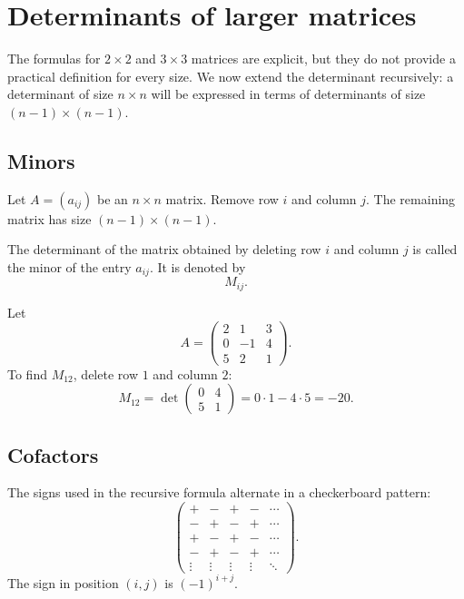 \section{Determinants of larger matrices}

The formulas for \(2\times2\) and \(3\times3\) matrices are explicit, but they do not provide a practical definition for every size. We now extend the determinant recursively: a determinant of size \(n\times n\) will be expressed in terms of determinants of size \((n-1)\times(n-1)\).

\subsection{Minors}

Let \(A=(a_{ij})\) be an \(n\times n\) matrix. Remove row \(i\) and column \(j\). The remaining matrix has size \((n-1)\times(n-1)\).

\begin{definitionbox}
The determinant of the matrix obtained by deleting row \(i\) and column \(j\) is called the minor of the entry \(a_{ij}\). It is denoted by
\[
M_{ij}.
\]
\end{definitionbox}

\begin{examplebox}
Let
\[
A=\begin{pmatrix}
2&1&3\\
0&-1&4\\
5&2&1
\end{pmatrix}.
\]
To find \(M_{12}\), delete row \(1\) and column \(2\):
\[
M_{12}
=
\det\begin{pmatrix}0&4\\5&1\end{pmatrix}
=0\cdot1-4\cdot5=-20.
\]
\end{examplebox}

\subsection{Cofactors}

The signs used in the recursive formula alternate in a checkerboard pattern:
\[
\begin{pmatrix}
+&-&+&-&\cdots\\
-&+&-&+&\cdots\\
+&-&+&-&\cdots\\
-&+&-&+&\cdots\\
\vdots&\vdots&\vdots&\vdots&\ddots
\end{pmatrix}.
\]
The sign in position \((i,j)\) is \((-1)^{i+j}\).

